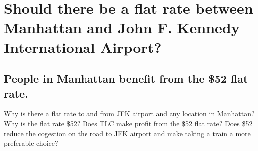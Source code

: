 \documentclass[12pt,twoside]{reedthesis}
\theoremstyle{definition}
\theoremstyle{definition}
\theoremstyle{definition}
\theoremstyle{remark}
\begin{document}
\section{Should there be a flat rate between Manhattan and John F.
Kennedy International
Airport?}\label{should-there-be-a-flat-rate-between-manhattan-and-john-f.-kennedy-international-airport}

\subsection{People in Manhattan benefit from the \$52 flat
rate.}\label{people-in-manhattan-benefit-from-the-52-flat-rate.}

Why is there a flat rate to and from JFK airport and any location in
Manhattan? Why is the flat rate \$52? Does TLC make profit from the \$52
flat rate? Does \$52 reduce the cogestion on the road to JFK airport and
make taking a train a more preferable choice?
\end{document}
